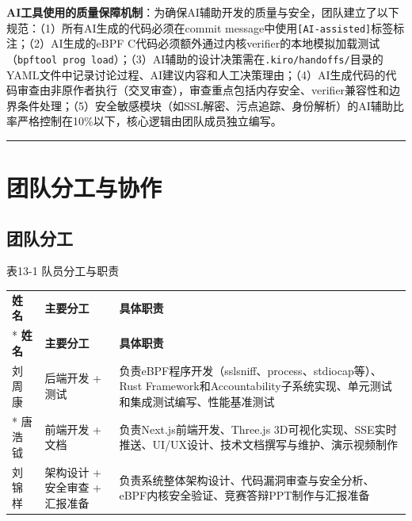\documentclass[a4paper]{ctexart}
\makeatletter
\renewcommand{\_}{%
  \ifmmode
    \nfss@text{\textunderscore}%
  \else
    \textunderscore\discretionary{}{}{}%
  \fi}
\makeatother
\begin{document}
\textbf{AI工具使用的质量保障机制}：为确保AI辅助开发的质量与安全，团队建立了以下规范：（1）所有AI生成的代码必须在commit message中使用\texttt{[AI-assisted]}标签标注；（2）AI生成的eBPF C代码必须额外通过内核verifier的本地模拟加载测试（\texttt{bpftool prog load}）；（3）AI辅助的设计决策需在\texttt{.kiro/handoffs/}目录的YAML文件中记录讨论过程、AI建议内容和人工决策理由；（4）AI生成代码的代码审查由非原作者执行（交叉审查），审查重点包括内存安全、verifier兼容性和边界条件处理；（5）安全敏感模块（如SSL解密、污点追踪、身份解析）的AI辅助比率严格控制在10\%以下，核心逻辑由团队成员独立编写。


\bigskip
\hrule
\bigskip


\section{团队分工与协作}



\subsection{团队分工}





\medskip
{\centering\small
表13-1 队员分工与职责\par
\vspace{3pt}
\setlength{\tabcolsep}{6pt}
\renewcommand{\arraystretch}{1.1}
\begin{longtable}{p{4.5cm} >{\raggedright\arraybackslash}p{4.5cm} >{\raggedright\arraybackslash}p{4.5cm}}
\hline
\textbf{姓名} & \textbf{主要分工} & \textbf{具体职责} \\*
\hline
\endfirsthead
\hline
\textbf{姓名} & \textbf{主要分工} & \textbf{具体职责} \\
\hline
\endhead
\hline
\endfoot
\hline
\endlastfoot
刘周康 & 后端开发 + 测试 & 负责eBPF程序开发（sslsniff、process、stdiocap等）、Rust Framework和Accountability子系统实现、单元测试和集成测试编写、性能基准测试 \\*
\hline
唐浩钺 & 前端开发 + 文档 & 负责Next.js前端开发、Three.js 3D可视化实现、SSE实时推送、UI/UX设计、技术文档撰写与维护、演示视频制作 \\
\hline
刘锦样 & 架构设计 + 安全审查 + 汇报准备 & 负责系统整体架构设计、代码漏洞审查与安全分析、eBPF内核安全验证、竞赛答辩PPT制作与汇报准备 \\
\hline
\end{longtable}
\par}
\end{document}
